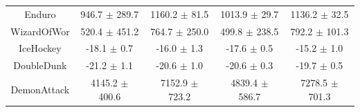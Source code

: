 \begin{table}[h]
\begin{tabular}{ccccc}
Enduro        &     946.7 $\pm$ 289.7 &     1160.2 $\pm$ 81.5 &     1013.9 $\pm$ 29.7 &     1136.2 $\pm$ 32.5 \\
WizardOfWor   &     520.4 $\pm$ 451.2 &     764.7 $\pm$ 250.0 &     499.8 $\pm$ 238.5 &     792.2 $\pm$ 101.3 \\
IceHockey     &       -18.1 $\pm$ 0.7 &       -16.0 $\pm$ 1.3 &       -17.6 $\pm$ 0.5 &       -15.2 $\pm$ 1.0 \\
DoubleDunk    &       -21.2 $\pm$ 1.1 &       -20.6 $\pm$ 1.0 &       -20.6 $\pm$ 0.3 &       -19.7 $\pm$ 0.5 \\
DemonAttack   &    4145.2 $\pm$ 400.6 &    7152.9 $\pm$ 723.2 &    4839.4 $\pm$ 586.7 &    7278.5 $\pm$ 701.3 \\
\bottomrule
\end{tabular}
\end{table}

